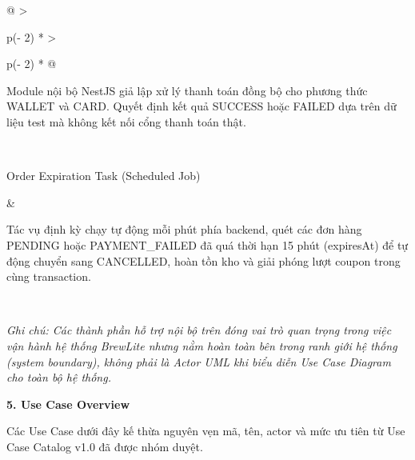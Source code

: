 \documentclass[11pt,a4paper,oneside]{report}
\begin{document}
\begin{longtable}[]{@{}
  >{\raggedright\arraybackslash}p{(\columnwidth - 2\tabcolsep) * }
  >{\raggedright\arraybackslash}p{(\columnwidth - 2\tabcolsep) * }@{}}
\begin{minipage}[b]{\linewidth}
Module nội bộ NestJS giả lập xử lý thanh toán đồng bộ cho phương thức WALLET và CARD. Quyết định kết quả SUCCESS hoặc FAILED dựa trên dữ liệu test mà không kết nối cổng thanh toán thật.
\end{minipage} \\
\begin{minipage}[b]{\linewidth}\raggedright
Order Expiration Task (Scheduled Job)
\end{minipage} & \begin{minipage}[b]{\linewidth}\raggedright
Tác vụ định kỳ chạy tự động mỗi phút phía backend, quét các đơn hàng PENDING hoặc PAYMENT\_FAILED đã quá thời hạn 15 phút (expiresAt) để tự động chuyển sang CANCELLED, hoàn tồn kho và giải phóng lượt coupon trong cùng transaction.
\end{minipage} \\
\midrule\noalign{}
\endhead
\bottomrule\noalign{}
\endlastfoot
\end{longtable}

\emph{Ghi chú: Các thành phần hỗ trợ nội bộ trên đóng vai trò quan trọng trong việc vận hành hệ thống BrewLite nhưng nằm hoàn toàn bên trong ranh giới hệ thống (system boundary), không phải là Actor UML khi biểu diễn Use Case Diagram cho toàn bộ hệ thống.}

\textbf{5. Use Case Overview}

Các Use Case dưới đây kế thừa nguyên vẹn mã, tên, actor và mức ưu tiên từ Use Case Catalog v1.0 đã được nhóm duyệt.
\end{document}
